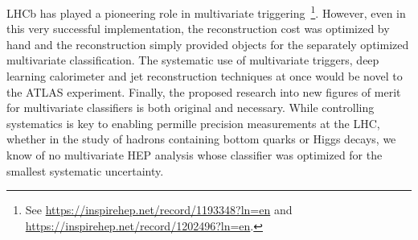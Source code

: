 

LHCb has played a pioneering role in multivariate triggering~\footnote{See \href{https://inspirehep.net/record/1193348?ln=en}{https://inspirehep.net/record/1193348?ln=en} and
\href{https://inspirehep.net/record/1202496?ln=en}{https://inspirehep.net/record/1202496?ln=en}.}.
However, even in this very successful implementation, the reconstruction cost was 
optimized by hand and the reconstruction simply provided objects for the separately
optimized multivariate classification. 
The systematic use of multivariate triggers, deep learning calorimeter and jet 
reconstruction techniques at once would be novel to the ATLAS experiment.
Finally, the proposed research into new figures of merit for multivariate classifiers is both original
and necessary. While controlling systematics is key to enabling permille precision measurements
at the LHC, whether in the study of hadrons containing bottom quarks or Higgs decays, we 
know of no multivariate HEP analysis whose classifier was optimized for the smallest
systematic uncertainty.


